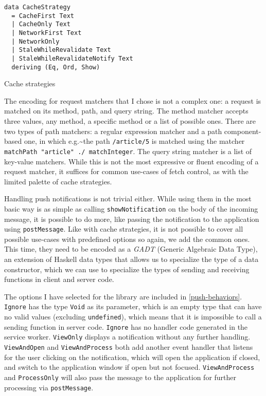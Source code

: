 \documentclass[english,odsaz]{fitthesis}
\begin{document}
\begin{listing}[htbp]
\begin{verbatim}
data CacheStrategy
  = CacheFirst Text
  | CacheOnly Text
  | NetworkFirst Text
  | NetworkOnly
  | StaleWhileRevalidate Text
  | StaleWhileRevalidateNotify Text
  deriving (Eq, Ord, Show)
\end{verbatim}
\caption{Cache strategies \label{cache-strategy}}
\end{listing}

The encoding for request matchers that I chose is not a complex one: a request
is matched on its method, path, and query string. The method matcher accepts
three values, any method, a specific method or a list of possible ones. There
are two types of path matchers: a regular expression matcher and a path
component-based one, in which e.g.\textasciitilde{}the path \texttt{/article/5} is matched using the
matcher \texttt{matchPath "article" ./ matchInteger}. The query string matcher is a list
of key-value matchers. While this is not the most expressive or fluent encoding
of a request matcher, it suffices for common use-cases of fetch control, as with
the limited palette of cache strategies.

Handling push notifications is not trivial either. While using them in the most
basic way is as simple as calling \texttt{showNotification} on the body of the incoming
message, it is possible to do more, like passing the notification to the
application using \texttt{postMessage}. Like with cache strategies, it is not possible to
cover all possible use-cases with predefined options so again, we add the common
ones. This time, they need to be encoded as a \emph{GADT} (Generic Algebraic Data Type),
an extension of Haskell data types that allows us to specialize the type of a data
constructor, which we can use to specialize the types of sending and receiving
functions in client and server code.

The options I have selected for the library are included in
\ref{push-behaviors}. \texttt{Ignore} has the type \texttt{Void} as its parameter, which is an empty
type that can have no valid values (excluding \texttt{undefined}), which means that it is
impossible to call a sending function in server code. \texttt{Ignore} has no handler code
generated in the service worker. \texttt{ViewOnly} displays a notification without any
further handling. \texttt{ViewAndOpen} and \texttt{ViewAndProcess} both add another event handler
that listens for the user clicking on the notification, which will open the
application if closed, and switch to the application window if open but not
focused. \texttt{ViewAndProcess} and \texttt{ProcessOnly} will also pass the message to the
application for further processing via \texttt{postMessage}.
\end{document}
